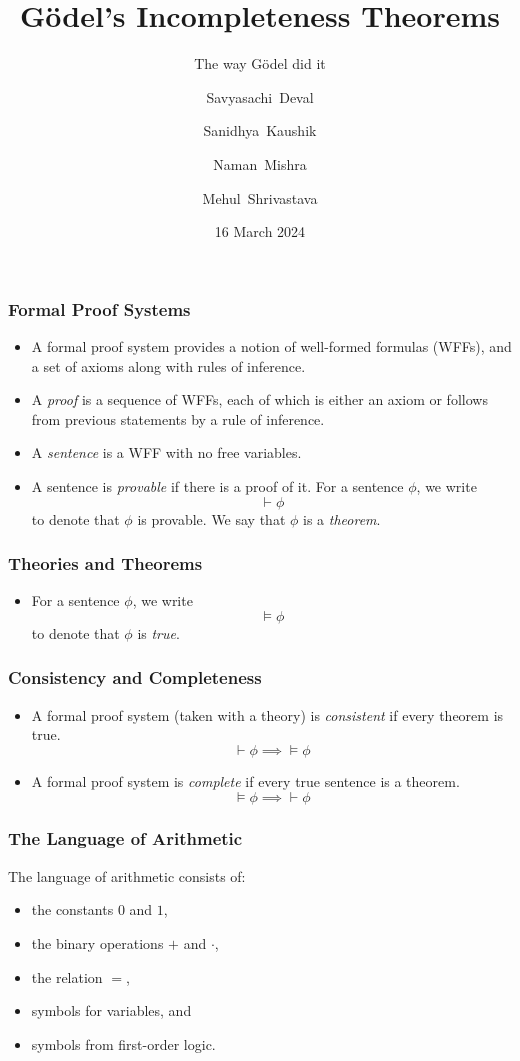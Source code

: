 \documentclass{beamer}
\title{G\"odel's Incompleteness Theorems}
\subtitle{The way G\"odel did it}
\author[Savyasachi, Sanidhya, Naman, Mehul]{Savyasachi~Deval
    \and Sanidhya~Kaushik \\
    \and Naman~Mishra
    \and Mehul~Shrivastava}
\date{16 March 2024}
\begin{document}
\frame{\titlepage}

\begin{frame}
\frametitle{Formal Proof Systems}
\begin{itemize}
    \item A formal proof system provides a notion of well-formed formulas (WFFs),
    and a set of axioms along with rules of inference.
    \item A \emph{proof} is a sequence of WFFs, each of which is either
    an axiom or follows from previous statements by a rule of inference.
    \item A \emph{sentence} is a WFF with no free variables.
    \item A sentence is \emph{provable} if there is a proof of it.
    For a sentence $\phi$, we write \[
        \vdash \phi
    \] to denote that $\phi$ is provable.
    We say that $\phi$ is a \emph{theorem}.
\end{itemize}
\end{frame}

\begin{frame}
\frametitle{Theories and Theorems}
\begin{itemize}
    \item For a sentence $\phi$, we write \[
        \vDash \phi
    \] to denote that $\phi$ is \emph{true}.
\end{itemize}
\end{frame}

\begin{frame}
\frametitle{Consistency and Completeness}
\begin{itemize}
    \item A formal proof system (taken with a theory) is \emph{consistent}
    if every theorem is true. \[
        \vdash \phi \implies \vDash \phi
    \]
    \item A formal proof system is \emph{complete} if every true sentence
    is a theorem. \[
        \vDash \phi \implies \vdash \phi
    \]
\end{itemize}
\end{frame}

\begin{frame}
\frametitle{The Language of Arithmetic}
The language of arithmetic consists of:
\begin{itemize}
    \item the constants $0$ and $1$,
    \item the binary operations $+$ and $\cdot$,
    \item the relation $=$,
    \item symbols for variables, and
    \item symbols from first-order logic.
\end{itemize}
\end{frame}
\end{document}
